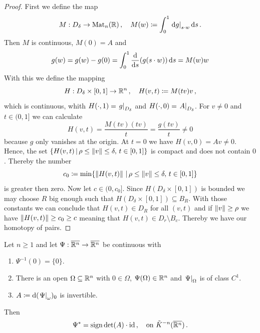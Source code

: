 \begin{proof}
First we define the map 
    \begin{equation*}
        M:D_\delta \to \operatorname{\mathrm{Mat}}_n(\mathbb{R})\,,\quad M(w)\coloneq \int_0^1\left.\mathop{}\!\mathrm{d} g\right|_{s\cdot w}\mathop{}\!\mathrm{d} s\,.
    \end{equation*} Then $M$ is continuous, $M(0)=A$ and 
    \begin{equation*}
        g(w)=g(w)-g(0)=\int_0^1 \frac{\mathop{}\!\mathrm{d}}{\mathop{}\!\mathrm{d} s}(g(s\cdot w))\mathop{}\!\mathrm{d} s=M(w)w
    \end{equation*} With this we define the mapping
    \begin{equation*}
        H:D_\delta \times [0,1] \to \mathbb{R}^n\,,\quad H(v,t)\coloneq M(tv)v\,,
    \end{equation*}which is continuous, whith $H(\cdot,1)=\left.g\right|_{D_\delta}$ and $H(\cdot,0)=\left.A\right|_{D_\delta}$. For $v\neq 0$ and $t\in (0,1]$ we can calculate
    \begin{equation*}
        H(v,t)=\frac{M(tv)(tv)}{t}=\frac{g(tv)}{t}\neq 0
    \end{equation*} because $g$ only vanishes at the origin. At $t=0$ we have $H(v,0)=Av\neq 0$. Hence, the set $\{H(v,t)\,|\, \rho\leq \left\lVert v\right\rVert\leq \delta,\, t\in [0,1]\}$ is compact and does not contain $0$. Thereby the number
    \begin{equation*}
        c_0\coloneq \min\{\left\lVert H(v,t)\right\rVert\,|\, \rho\leq \left\lVert v\right\rVert\leq \delta,\, t\in [0,1]\}
    \end{equation*} is greater then zero. Now let $c\in (0,c_0]$. Since $H(D_\delta\times [0,1])$ is bounded we may choose $R$ big enough such that $H(D_\delta\times [0,1]) \subseteq B_R$.
    With those constants we can conclude that $H(v,t)\in D_R$ for all $(v,t)$ and if $\left\lVert v\right\rVert\geq \rho$ we have $\left\lVert H(v,t)\right\rVert\geq c_0\geq c$ meaning that $H(v,t)\in D_r\setminus B_c$. Thereby we have our homotopy of pairs. 
\end{proof}
\begin{proposition} \label{prop:orient-localIndex}
    Let $n\geq 1$ and let $\Psi:\overline{\mathbb{R}^n} \to \overline{\mathbb{R}^n}$ be continuous with
    \begin{enumerate}
        \item $\Psi^{-1}(0)=\{0\}$.
        \item There is an open $\Omega\subseteq \mathbb{R}^n$ with $0\in \Omega$, $\Psi(\Omega)\in \mathbb{R}^n$ and $\left.\Psi\right|_{\Omega}$ is of class $C^1$.
        \item $A\coloneq \mathop{}\!\mathrm{d}(\left.\Psi\right|_{\omega})_0$ is invertible.
        \end{enumerate} Then 
        \begin{equation*}
            \Psi^*=\mathrm{sign} \det(A) \cdot \operatorname{\mathrm{id}}\,,\quad \text{on }\tilde{K}^{-n}(\overline{\mathbb{R}^n})\,.
        \end{equation*}
\end{proposition}
